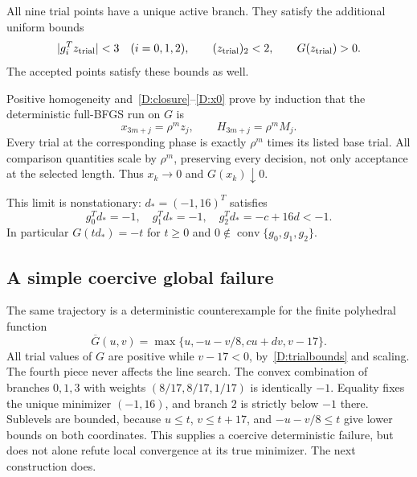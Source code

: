 All nine trial points have a unique active branch. They satisfy the additional uniform bounds
\begin{equation}\label{D:trialbounds}
 |g_i^Tz_{\rm trial}|<3\quad(i=0,1,2),
 \qquad (z_{\rm trial})_2<2,
 \qquad G(z_{\rm trial})>0.
\end{equation}
The accepted points satisfy these bounds as well.

Positive homogeneity and~\eqref{D:closure}--\eqref{D:x0} prove by induction that the deterministic full-BFGS run on $G$ is
\[
 x_{3m+j}=\rho^m z_j,\qquad H_{3m+j}=\rho^m M_j.
\]
Every trial at the corresponding phase is exactly $\rho^m$ times its listed base trial. All comparison quantities scale by $\rho^m$, preserving every decision, not only acceptance at the selected length. Thus $x_k\to0$ and $G(x_k)\downarrow0$.

This limit is nonstationary: $d_* =(-1,16)^T$ satisfies
\[
 g_0^Td_*=-1,\quad g_1^Td_*=-1,\quad g_2^Td_*=-c+16d<-1.
\]
In particular $G(td_*)=-t$ for $t\ge0$ and $0\notin\operatorname{conv}\{g_0,g_1,g_2\}$.

\subsection{A simple coercive global failure}
The same trajectory is a deterministic counterexample for the finite polyhedral function
\[
 \overline G(u,v)=\max\{u,-u-v/8,cu+dv,v-17\}.
\]
All trial values of $G$ are positive while $v-17<0$, by~\eqref{D:trialbounds} and scaling. The fourth piece never affects the line search. The convex combination of branches $0,1,3$ with weights $(8/17,8/17,1/17)$ is identically $-1$. Equality fixes the unique minimizer $(-1,16)$, and branch $2$ is strictly below $-1$ there. Sublevels are bounded, because $u\le t$, $v\le t+17$, and $-u-v/8\le t$ give lower bounds on both coordinates. This supplies a coercive deterministic failure, but does not alone refute local convergence at its true minimizer. The next construction does.


\setcounter{section}{3}
\setcounter{theorem}{1}
\setcounter{lemma}{1}
\setcounter{corollary}{0}
\setcounter{proposition}{0}
\setcounter{remark}{0}
\setcounter{equation}{7}
